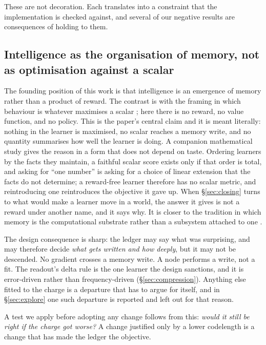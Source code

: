 \documentclass[11pt,a4paper]{article}
\theoremstyle{plain}
\theoremstyle{definition}
\theoremstyle{remark}
\begin{document}
These are not decoration. Each translates into a constraint that the
implementation is checked against, and several of our negative results are
consequences of holding to them.

\subsection{Intelligence as the organisation of memory, not as optimisation
against a scalar}

The founding position of this work is that intelligence is an emergence of
memory rather than a product of reward. The contrast is with the framing in
which behaviour is whatever maximises a scalar
\citep{sutton2018reinforcement,silver2021reward}; here there is no reward, no
value function, and no policy. This is the paper's central claim and it is meant
literally: nothing in the learner is maximised, no scalar reaches a memory
write, and no quantity summarises how well the learner is doing. A companion
mathematical study \citep{yang2026gluing} gives the reason in a form that does
not depend on taste. Ordering learners by the facts they maintain, a faithful
scalar score exists only if that order is total, and asking for ``one number''
is asking for a choice of linear extension that the facts do not determine; a
reward-free learner therefore has no scalar metric, and reintroducing one
reintroduces the objective it gave up. When \S\ref{sec:closing} turns to what
would make a learner move in a world, the answer it gives is not a reward under
another name, and it says why. It is closer to the tradition in which memory is
the computational substrate rather than a subsystem attached to one
\citep{hebb1949organization,tulving1972episodic,gallistel2009memory}.

The design consequence is sharp: the ledger may say what was surprising, and may
therefore decide \emph{what gets written and how deeply}, but it may not be
descended. No gradient crosses a memory write. A node performs a write, not a
fit. The readout's delta rule is the one learner the design sanctions, and it is
error-driven rather than frequency-driven (\S\ref{sec:compression}). Anything
else fitted to the charge is a departure that has to argue for itself, and in
\S\ref{sec:explore} one such departure is reported and left out for that reason.

A test we apply before adopting any change follows from this: \emph{would it
still be right if the charge got worse?} A change justified only by a lower
codelength is a change that has made the ledger the objective.
\end{document}
